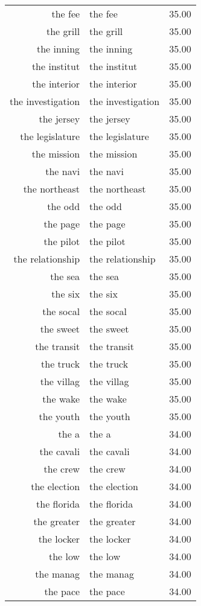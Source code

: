 \begin{table}[ht]
\begin{tabular}{rlr}
  the fee & the fee & 35.00 \\ 
  the grill & the grill & 35.00 \\ 
  the inning & the inning & 35.00 \\ 
  the institut & the institut & 35.00 \\ 
  the interior & the interior & 35.00 \\ 
  the investigation & the investigation & 35.00 \\ 
  the jersey & the jersey & 35.00 \\ 
  the legislature & the legislature & 35.00 \\ 
  the mission & the mission & 35.00 \\ 
  the navi & the navi & 35.00 \\ 
  the northeast & the northeast & 35.00 \\ 
  the odd & the odd & 35.00 \\ 
  the page & the page & 35.00 \\ 
  the pilot & the pilot & 35.00 \\ 
  the relationship & the relationship & 35.00 \\ 
  the sea & the sea & 35.00 \\ 
  the six & the six & 35.00 \\ 
  the socal & the socal & 35.00 \\ 
  the sweet & the sweet & 35.00 \\ 
  the transit & the transit & 35.00 \\ 
  the truck & the truck & 35.00 \\ 
  the villag & the villag & 35.00 \\ 
  the wake & the wake & 35.00 \\ 
  the youth & the youth & 35.00 \\ 
  the a & the a & 34.00 \\ 
  the cavali & the cavali & 34.00 \\ 
  the crew & the crew & 34.00 \\ 
  the election & the election & 34.00 \\ 
  the florida & the florida & 34.00 \\ 
  the greater & the greater & 34.00 \\ 
  the locker & the locker & 34.00 \\ 
  the low & the low & 34.00 \\ 
  the manag & the manag & 34.00 \\ 
  the pace & the pace & 34.00 \\ 

\end{tabular}
\end{table}
